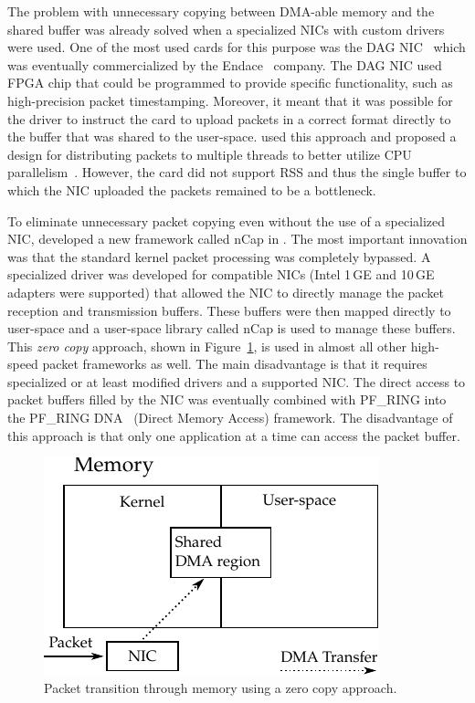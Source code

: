 The problem with unnecessary copying between DMA-able memory and the shared buffer was already solved when a specialized NICs with custom drivers were used. One of the most used cards for this purpose was the DAG NIC~\cite{UniversityWaikato--Dag} which was eventually commercialized by the Endace~\cite{ETL--Endace} company. The DAG NIC used FPGA chip that could be programmed to provide specific functionality, such as high-precision packet timestamping. Moreover, it meant that it was possible for the driver to instruct the card to upload packets in a correct format directly to the buffer that was shared to the user-space. \citeauthor{Degioanni-2004-Introducing} used this approach and proposed a design for distributing packets to multiple threads to better utilize CPU parallelism~\cite{Degioanni-2004-Introducing}. However, the card did not support RSS and thus the single buffer to which the NIC uploaded the packets remained to be a bottleneck.

To eliminate unnecessary packet copying even without the use of a specialized NIC, \citeauthor{Deri-2005-nCap} developed a new framework called nCap in \citeyear{Deri-2005-nCap}. The most important innovation was that the standard kernel packet processing was completely bypassed. A specialized driver was developed for compatible NICs (Intel 1\,GE and 10\,GE adapters were supported) that allowed the NIC to directly manage the packet reception and transmission buffers. These buffers were then mapped directly to user-space and a user-space library called nCap is used to manage these buffers. This \emph{zero copy} approach, shown in Figure~\ref{fig:zero_copy}, is used in almost all other high-speed packet frameworks as well. The main disadvantage is that it requires specialized or at least modified drivers and a supported NIC. The direct access to packet buffers filled by the NIC was eventually combined with PF\_RING into the PF\_RING DNA~\cite{ntop-2010-PFRING} (Direct Memory Access) framework. The disadvantage of this approach is that only one application at a time can access the packet buffer.

\begin{figure}[!tb]
  \begin{center}
    \includegraphics{figures/zero_copy}
  \end{center}
  \caption{Packet transition through memory using a zero copy approach.}
  \label{fig:zero_copy}
\end{figure}

